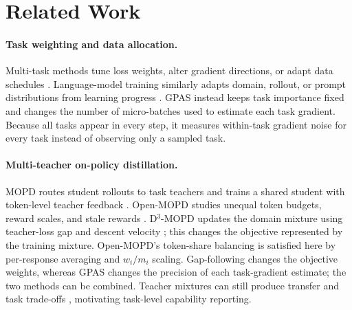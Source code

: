 \section{Related Work}

\paragraph{Task weighting and data allocation.}
Multi-task methods tune loss weights, alter gradient directions, or adapt data
schedules
\citep{sener2019multitasklearningmultiobjectiveoptimization,
yu2020gradientsurgerymultitasklearning,
liu2024conflictaversegradientdescentmultitask,chen2018gradnorm}.
Language-model training similarly adapts domain, rollout, or prompt
distributions from learning progress
\citep{albalak2023efficient,wang2025dump,zheng2025greso,
gao2025promptcurriculum}. GPAS instead keeps task importance fixed and changes
the number of micro-batches used to estimate each task gradient. Because all
tasks appear in every step, it measures within-task gradient noise for every
task instead of observing only a sampled task.

\paragraph{Multi-teacher on-policy distillation.}
MOPD routes student rollouts to task teachers and trains a shared student with
token-level teacher feedback \citep{ma2026mopdmultiteacheronpolicydistillation}.
Open-MOPD studies unequal token budgets, reward scales, and stale rewards
\citep{gao2026openmopddiagnosingfixingcapability}. D$^3$-MOPD updates the domain
mixture using teacher-loss gap and descent velocity \citep{sun2026d3mopd}; this
changes the objective represented by the training mixture. Open-MOPD's
token-share balancing is satisfied here by per-response averaging and
$w_i/m_i$ scaling. Gap-following changes the objective weights, whereas GPAS
changes the precision of each task-gradient estimate; the two methods can be
combined. Teacher mixtures can still produce transfer and task trade-offs
\citep{li2026coinsidesdualnature}, motivating task-level capability reporting.

